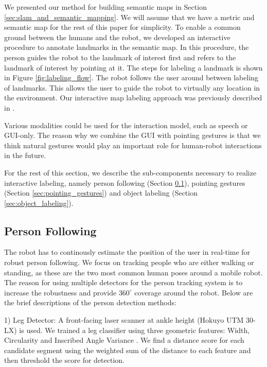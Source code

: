 \documentclass{tADR2e}
\begin{document}
We presented our method for building semantic maps in Section \ref{sec:slam_and_semantic_mapping}. We will assume that we have a metric and semantic map for the rest of this paper for simplicity. To enable a common ground between the humans and the robot, we developed an interactive procedure to annotate landmarks in the semantic map. In this procedure, the person guides the robot to the landmark of interest first and refers to the landmark of interest by pointing at it. The steps for labeling a landmark is shown in Figure \ref{fig:labeling_flow}. The robot follows the user around between labeling of landmarks. This allows the user to guide the robot to virtually any location in the environment. Our interactive map labeling approach was previously described in \cite{trevor2012interactive}.

Various modalities could be used for the interaction model, such as speech or GUI-only. The reason why we combine the GUI with pointing gestures is that we think natural gestures would play an important role for human-robot interactions in the future.

For the rest of this section, we describe the sub-components necessary to realize interactive labeling, namely person following (Section \ref{sec:person_following}), pointing gestures (Section \ref{sec:pointing_gestures}) and object labeling (Section \ref{sec:object_labeling}).

\subsection{Person Following}
\label{sec:person_following}

The robot has to continously estimate the position of the user in real-time for robust person following. We focus on tracking people who are either walking or standing, as these are the two most common human poses around a mobile robot. The reason for using multiple detectors for the person tracking system is to increase the robustness and provide $360^{\circ}$ coverage around the robot. Below are the brief descriptions of the person detection methods:

1) Leg Detector: A front-facing laser scanner at ankle height (Hokuyo UTM 30-LX) is used. We trained a leg classifier using three geometric features: Width, Circularity and Inscribed Angle Variance \cite{xavier2005fast}. We find a distance score for each candidate segment using the weighted sum of the distance to each feature and then threshold the score for detection.
\end{document}
